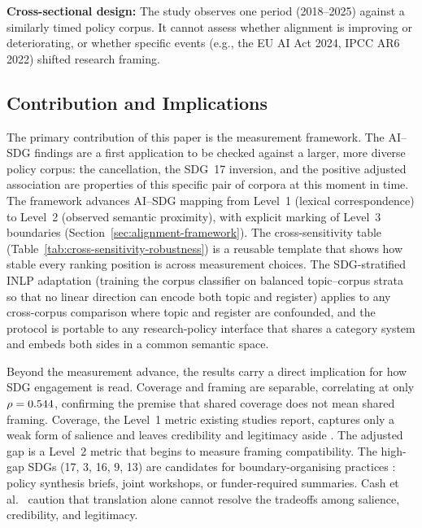 \documentclass[12pt,a4paper]{article}
\begin{document}
\textbf{Cross-sectional design:} The study observes one period (2018--2025) against a similarly timed policy corpus. It cannot assess whether alignment is improving or deteriorating, or whether specific events (e.g., the EU AI Act 2024, IPCC AR6 2022) \parencite{EUAI2024, IPCC2022} shifted research framing.

\subsection{Contribution and Implications}
\label{sec:framework-contribution}

The primary contribution of this paper is the measurement framework. The AI--SDG findings are a first application to be checked against a larger, more diverse policy corpus: the cancellation, the SDG~17 inversion, and the positive adjusted association are properties of this specific pair of corpora at this moment in time. The framework advances AI--SDG mapping from Level~1 (lexical correspondence) to Level~2 (observed semantic proximity), with explicit marking of Level~3 boundaries (Section~\ref{sec:alignment-framework}). The cross-sensitivity table (Table~\ref{tab:cross-sensitivity-robustness}) is a reusable template that shows how stable every ranking position is across measurement choices. The SDG-stratified INLP adaptation (training the corpus classifier on balanced topic--corpus strata so that no linear direction can encode both topic and register) applies to any cross-corpus comparison where topic and register are confounded, and the protocol is portable to any research-policy interface that shares a category system and embeds both sides in a common semantic space.

Beyond the measurement advance, the results carry a direct implication for how SDG engagement is read. Coverage and framing are separable, correlating at only $\rho = 0.544{}$, confirming the premise that shared coverage does not mean shared framing. Coverage, the Level~1 metric existing studies report, captures only a weak form of salience and leaves credibility and legitimacy aside \parencite{Cash2003}. The adjusted gap is a Level~2 metric that begins to measure framing compatibility. The high-gap SDGs (17, 3, 16, 9, 13) are candidates for boundary-organising practices \parencite{Guston2001}: policy synthesis briefs, joint workshops, or funder-required summaries. Cash et al.\ \parencite{Cash2003} caution that translation alone cannot resolve the tradeoffs among salience, credibility, and legitimacy.
\end{document}
